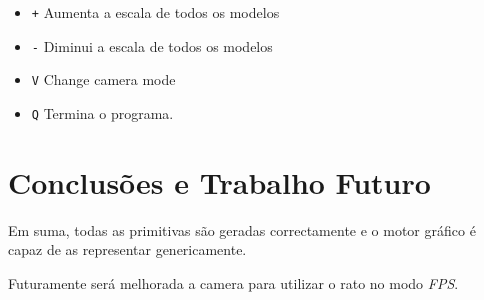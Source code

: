 \documentclass[a4paper]{article}
\begin{document}
\begin{itemize}
    \item \texttt{+} Aumenta a escala de todos os modelos
    \item \texttt{-} Diminui a escala de todos os modelos
    \item \texttt{V} Change camera mode
    \item \texttt{Q} Termina o programa.
\end{itemize}

\section{Conclusões e Trabalho Futuro}
Em suma, todas as primitivas são geradas correctamente e o motor gráfico é capaz de as representar genericamente.

Futuramente será melhorada a camera para utilizar o rato no modo \textit{FPS}.
\end{document}
